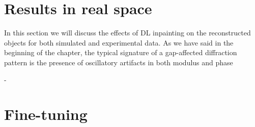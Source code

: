 \section{Results in real space}\label{sec:res_real}

In this section we will discuss the effects of DL inpainting on the reconstructed objects for both simulated and experimental 
data. As we have said in the beginning of the chapter, the typical signature of a gap-affected diffraction pattern is the
presence of oscillatory artifacts in both modulus and phase  

- 


\section{Fine-tuning}\label{sec:finetuning}

